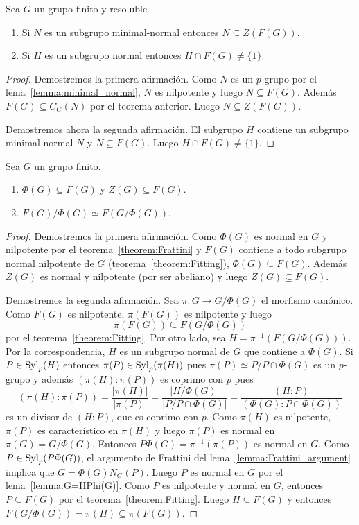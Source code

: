 \begin{corollary}
	Sea $G$ un grupo finito y resoluble. 
	\begin{enumerate}
		\item Si $N$ es un subgrupo minimal-normal entonces $N\subseteq
			Z(F(G))$. 
		\item Si $H$ es un subgrupo normal entonces $H\cap F(G)\ne\{1\}$.
	\end{enumerate}
\end{corollary}

\begin{proof}
	Demostremos la primera afirmación. Como $N$ es un $p$-grupo por el
	lema~\ref{lemma:minimal_normal}, $N$ es nilpotente y luego $N\subseteq
	F(G)$. 	Además $F(G)\subseteq C_G(N)$ por el
	teorema anterior.  Luego $N\subseteq Z(F(G))$. 

	Demostremos ahora la segunda afirmación. El subgrupo $H$ contiene un
	subgrupo minimal-normal $N$ y $N\subseteq F(G)$. Luego $H\cap F(G)\ne\{1\}$. 
\end{proof}

\begin{theorem}
	Sea $G$ un grupo finito.
	\begin{enumerate}
		\item $\Phi(G)\subseteq F(G)$ y $Z(G)\subseteq F(G)$.
		\item $F(G)/\Phi(G)\simeq F(G/\Phi(G))$.
	\end{enumerate}
\end{theorem}

\begin{proof}
	Demostremos la primera afirmación. Como $\Phi(G)$ es normal en $G$ y
	nilpotente por el teorema~\ref{theorem:Frattini} y $F(G)$ contiene a todo
	subgrupo normal nilpotente de $G$ (teorema~\ref{theorem:Fitting}),
	$\Phi(G)\subseteq F(G)$. Además $Z(G)$ es normal y nilpotente (por ser
	abeliano) y luego $Z(G)\subseteq F(G)$.

	Demostremos la segunda afirmación. Sea $\pi\colon G\to G/\Phi(G)$ el
	morfismo canónico. Como $F(G)$ es nilpotente, $\pi(F(G))$ es nilpotente y
	luego 
	\[
	\pi(F(G))\subseteq F(G/\Phi(G))
	\]
	por el teorema~\ref{theorem:Fitting}. Por otro lado, sea
	$H=\pi^{-1}(F(G/\Phi(G)))$. Por la correspondencia, $H$ es un subgrupo
	normal de $G$ que contiene a $\Phi(G)$. Si $P\in\mathrm{Syl}_p(H)$ entonces
	$\pi(P)\in\mathrm{Syl}_p(\pi(H))$ pues $\pi(P)\simeq P/P\cap \Phi(G)$ es un
	$p$-grupo y además $(\pi(H):\pi(P))$ es coprimo con $p$ pues 
	\[
	(\pi(H):\pi(P))
	=\frac{|\pi(H)|}{|\pi(P)|}
	=\frac{|H/\Phi(G)|}{|P/P\cap \Phi(G)|}
	=\frac{(H:P)}{(\Phi(G):P\cap\Phi(G))}
	\]
	es un divisor de $(H:P)$, que es coprimo con $p$. Como $\pi(H)$ es
	nilpotente, $\pi(P)$ es característico en $\pi(H)$ y luego $\pi(P)$ es
	normal en $\pi(G)=G/\Phi(G)$. Entonces $P\Phi(G)=\pi^{-1}(\pi(P))$ es
	normal en $G$. Como $P\in\mathrm{Syl}_p(P\Phi(G))$, el argumento de Frattini del
	lema~\ref{lemma:Frattini_argument} implica que $G=\Phi(G)N_G(P)$. Luego $P$
	es normal en $G$ por el lema~\ref{lemma:G=HPhi(G)}. Como $P$ es nilpotente
	y normal en $G$, entonces $P\subseteq F(G)$ por el
	teorema~\ref{theorem:Fitting}. Luego $H\subseteq F(G)$ y entonces
	$F(G/\Phi(G))=\pi(H)\subseteq \pi(F(G))$.
\end{proof}

